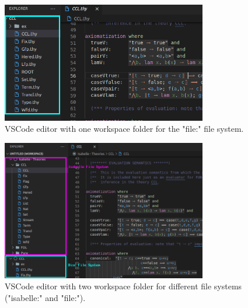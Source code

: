 
\begin{figure}[htbp]
    \centering
    \includegraphics[width=0.8\textwidth]{figures/problem2/old_editor_rectangle.png}
    \caption{VSCode editor with one workspace folder for the "file:" file system.}
    \label{fig:workspace-old}
\end{figure}
\begin{figure}[htbp]
    \centering
    \includegraphics[width=0.8\textwidth]{figures/problem2/new_editor_annotated.png}
    \caption{VSCode editor with two workspace folder for different file systems ("isabelle:" and "file:").}
    \label{fig:workspace-new}
\end{figure}